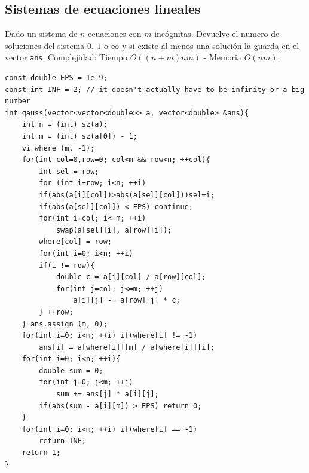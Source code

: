 \documentclass[10pt,spanish,mexico]{article}
\numberwithin{equation}{section}
\begin{document}
\begin{multicols}{2}
\vspace{-1.2\baselineskip}
\hrulefill
\subsection{Sistemas de ecuaciones lineales }
Dado un sistema de $n$ ecuaciones  con $m$ incógnitas. Devuelve el numero de soluciones del sistema $0, \ 1 $ o $\infty$ y si existe al menos una solución la guarda en el vector \texttt{ans}. Complejidad: Tiempo $O(  (n+m)nm ) $ - Memoria $O(nm)$.
\begin{verbatim}
const double EPS = 1e-9;
const int INF = 2; // it doesn't actually have to be infinity or a big number
int gauss(vector<vector<double>> a, vector<double> &ans){
    int n = (int) sz(a);
    int m = (int) sz(a[0]) - 1;
    vi where (m, -1);
    for(int col=0,row=0; col<m && row<n; ++col){
        int sel = row;
        for (int i=row; i<n; ++i)
        if(abs(a[i][col])>abs(a[sel][col]))sel=i;
        if(abs(a[sel][col]) < EPS) continue;
        for(int i=col; i<=m; ++i)
            swap(a[sel][i], a[row][i]);
        where[col] = row;
        for(int i=0; i<n; ++i)
        if(i != row){
            double c = a[i][col] / a[row][col];
            for(int j=col; j<=m; ++j)
                a[i][j] -= a[row][j] * c;
        } ++row;
    } ans.assign (m, 0);
    for(int i=0; i<m; ++i) if(where[i] != -1)
        ans[i] = a[where[i]][m] / a[where[i]][i];
    for(int i=0; i<n; ++i){
        double sum = 0;
        for(int j=0; j<m; ++j)
            sum += ans[j] * a[i][j];
        if(abs(sum - a[i][m]) > EPS) return 0;
    }
    for(int i=0; i<m; ++i) if(where[i] == -1)
        return INF;
    return 1;
}
\end{verbatim}

\vspace{-1.2\baselineskip}
\hrulefill

\end{multicols}
\end{document}
